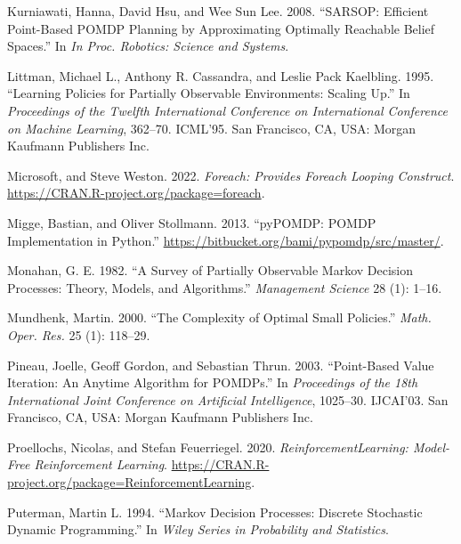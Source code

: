 \begin{CSLReferences}{1}{0}
\leavevmode{}%
Kurniawati, Hanna, David Hsu, and Wee Sun Lee. 2008. {``{SARSOP:} {E}fficient Point-Based POMDP Planning by Approximating Optimally Reachable Belief Spaces.''} In \emph{In Proc. Robotics: Science and Systems}.

\leavevmode{}%
Littman, Michael L., Anthony R. Cassandra, and Leslie Pack Kaelbling. 1995. {``Learning Policies for Partially Observable Environments: {S}caling Up.''} In \emph{Proceedings of the Twelfth International Conference on International Conference on Machine Learning}, 362--70. ICML'95. San Francisco, CA, USA: Morgan Kaufmann Publishers Inc.

\leavevmode{}%
Microsoft, and Steve Weston. 2022. \emph{Foreach: Provides Foreach Looping Construct}. \url{https://CRAN.R-project.org/package=foreach}.

\leavevmode{}%
Migge, Bastian, and Oliver Stollmann. 2013. {``{pyPOMDP:} {POMDP} Implementation in {Python}.''} \url{https://bitbucket.org/bami/pypomdp/src/master/}.

\leavevmode{}%
Monahan, G. E. 1982. {``A Survey of Partially Observable {M}arkov Decision Processes: {T}heory, Models, and Algorithms.''} \emph{Management Science} 28 (1): 1--16.

\leavevmode{}%
Mundhenk, Martin. 2000. {``The Complexity of Optimal Small Policies.''} \emph{Math. Oper. Res.} 25 (1): 118--29.

\leavevmode{}%
Pineau, Joelle, Geoff Gordon, and Sebastian Thrun. 2003. {``Point-Based Value Iteration: {A}n Anytime Algorithm for {POMDPs}.''} In \emph{Proceedings of the 18th International Joint Conference on Artificial Intelligence}, 1025--30. IJCAI'03. San Francisco, CA, USA: Morgan Kaufmann Publishers Inc.

\leavevmode{}%
Proellochs, Nicolas, and Stefan Feuerriegel. 2020. \emph{ReinforcementLearning: {M}odel-Free Reinforcement Learning}. \url{https://CRAN.R-project.org/package=ReinforcementLearning}.

\leavevmode{}%
Puterman, Martin L. 1994. {``Markov Decision Processes: {D}iscrete Stochastic Dynamic Programming.''} In \emph{Wiley Series in Probability and Statistics}.


\end{CSLReferences}
